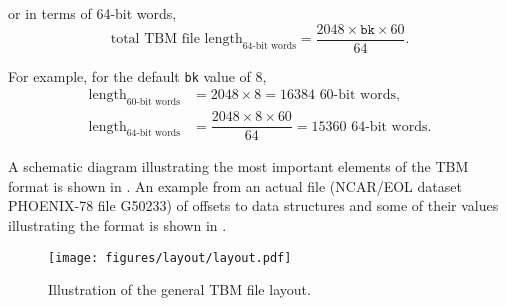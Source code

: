 \documentclass{report}
\begin{document}
\noindent or in terms of 64-bit words,
\[
	\text{total TBM file length}_\text{64-bit words} = \dfrac{2048 \times \texttt{bk} \times 60}{64} \mathrm{.}
\]

For example, for the default \texttt{bk} value of \(8\),
\begin{align*}
	\text{length}_\text{60-bit words} &= 2048 \times 8 = 16384 \text{ 60-bit words} \mathrm{,} \\
	\text{length}_\text{64-bit words} &= \dfrac{2048 \times 8 \times 60}{64} = 15360 \text{ 64-bit words} \mathrm{.}
\end{align*}

A schematic diagram illustrating the most important elements of the TBM format is shown in . An example from an actual file (NCAR/EOL dataset PHOENIX-78 file G50233) of offsets to data structures and some of their values illustrating the format is shown in .

\begin{figure}
	\centering
	\texttt{[image: figures/layout/layout.pdf]}
	\caption{Illustration of the general TBM file layout.}
	\label{Fig.TBMLayout}
\end{figure}
\end{document}
